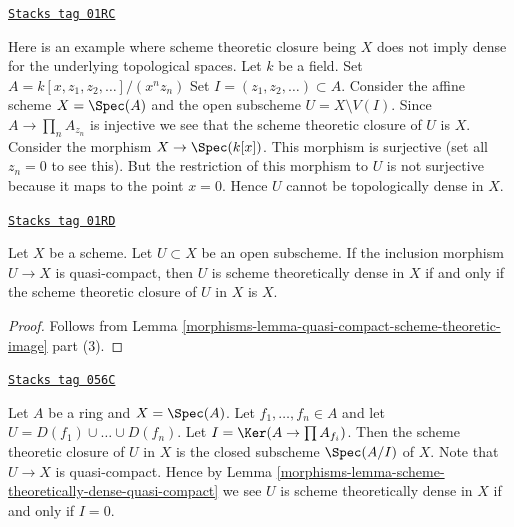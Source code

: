 \begin{example}
\label{morphisms-example-scheme-theretically-dense-not-dense}
\href{https://stacks.math.columbia.edu/tag/01RC}{\texttt{Stacks tag 01RC}}

Here is an example where scheme theoretic closure being $X$ does not
imply dense for the underlying topological spaces.
Let $k$ be a field.
Set $A = k[x, z_1, z_2, \ldots]/(x^n z_n)$
Set $I = (z_1, z_2, \ldots) \subset A$.
Consider the affine scheme $X = \Spec(A)$ and the
open subscheme $U = X \setminus V(I)$.
Since $A \to \prod_n A_{z_n}$ is injective we see that the scheme theoretic
closure of $U$ is $X$. Consider the morphism
$X \to \Spec(k[x])$. This morphism is surjective
(set all $z_n = 0$ to see this). But the restriction
of this morphism to $U$ is not surjective because it maps
to the point $x = 0$. Hence $U$ cannot be topologically dense
in $X$.
\end{example}

\begin{lemma}
\label{morphisms-lemma-scheme-theoretically-dense-quasi-compact}
\href{https://stacks.math.columbia.edu/tag/01RD}{\texttt{Stacks tag 01RD}}

Let $X$ be a scheme.
Let $U \subset X$ be an open subscheme.
If the inclusion morphism $U \to X$ is quasi-compact, then $U$
is scheme theoretically dense in $X$ if and only if the scheme theoretic
closure of $U$ in $X$ is $X$.
\end{lemma}

\begin{proof}

Follows from Lemma \ref{morphisms-lemma-quasi-compact-scheme-theoretic-image} part (3).
\end{proof}

\begin{example}
\label{morphisms-example-scheme-theoretic-closure}
\href{https://stacks.math.columbia.edu/tag/056C}{\texttt{Stacks tag 056C}}

Let $A$ be a ring and $X = \Spec(A)$.
Let $f_1, \ldots, f_n \in A$ and let $U = D(f_1) \cup \ldots \cup D(f_n)$.
Let $I = \Ker(A \to \prod A_{f_i})$.
Then the scheme theoretic closure of $U$ in $X$
is the closed subscheme $\Spec(A/I)$ of $X$.
Note that $U \to X$ is quasi-compact. Hence by
Lemma \ref{morphisms-lemma-scheme-theoretically-dense-quasi-compact}
we see $U$ is scheme theoretically dense in $X$ if and only if $I = 0$.
\end{example}

